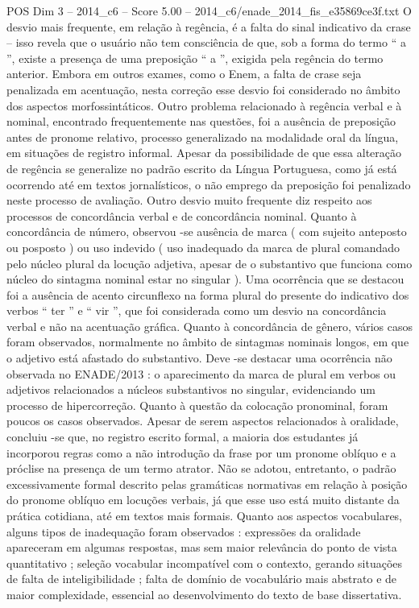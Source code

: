 \begin{textsample}{POS Dim 3 – 2014\_c6 – Score 5.00 – 2014\_c6/enade\_2014\_fis\_e35869ce3f.txt}
O desvio mais frequente, em relação à regência, é a falta do sinal indicativo da crase – isso revela que o usuário não tem consciência de que, sob a forma do termo “ a ”, existe a presença de uma preposição “ a ”, exigida pela regência do termo anterior.
Embora em outros exames, como o Enem, a falta de crase seja penalizada em acentuação, nesta correção esse desvio foi considerado no âmbito dos aspectos morfossintáticos.
Outro problema relacionado à regência verbal e à nominal, encontrado frequentemente nas questões, foi a ausência de preposição antes de pronome relativo, processo generalizado na modalidade oral da língua, em situações de registro informal.
Apesar da possibilidade de que essa alteração de regência se generalize no padrão escrito da Língua Portuguesa, como já está ocorrendo até em textos jornalísticos, o não emprego da preposição foi penalizado neste processo de avaliação.
Outro desvio muito frequente diz respeito aos processos de concordância verbal e de concordância nominal.
Quanto à concordância de número, observou -se ausência de marca ( com sujeito anteposto ou posposto ) ou uso indevido ( uso inadequado da marca de plural comandado pelo núcleo plural da locução adjetiva, apesar de o substantivo que funciona como núcleo do sintagma nominal estar no singular ).
Uma ocorrência que se destacou foi a ausência de acento circunflexo na forma plural do presente do indicativo dos verbos “ ter ” e “ vir ”, que foi considerada como um desvio na concordância verbal e não na acentuação gráfica.
Quanto à concordância de gênero, vários casos foram observados, normalmente no âmbito de sintagmas nominais longos, em que o adjetivo está afastado do substantivo.
Deve -se destacar uma ocorrência não observada no ENADE/2013 : o aparecimento da marca de plural em verbos ou adjetivos relacionados a núcleos substantivos no singular, evidenciando um processo de hipercorreção.
Quanto à questão da colocação pronominal, foram poucos os casos observados.
Apesar de serem aspectos relacionados à oralidade, concluiu -se que, no registro escrito formal, a maioria dos estudantes já incorporou regras como a não introdução da frase por um pronome oblíquo e a próclise na presença de um termo atrator.
Não se adotou, entretanto, o padrão excessivamente formal descrito pelas gramáticas normativas em relação à posição do pronome oblíquo em locuções verbais, já que esse uso está muito distante da prática cotidiana, até em textos mais formais.
Quanto aos aspectos vocabulares, alguns tipos de inadequação foram observados : expressões da oralidade apareceram em algumas respostas, mas sem maior relevância do ponto de vista quantitativo ; seleção vocabular incompatível com o contexto, gerando situações de falta de inteligibilidade ; falta de domínio de vocabulário mais abstrato e de maior complexidade, essencial ao desenvolvimento do texto de base dissertativa.

\end{textsample}
